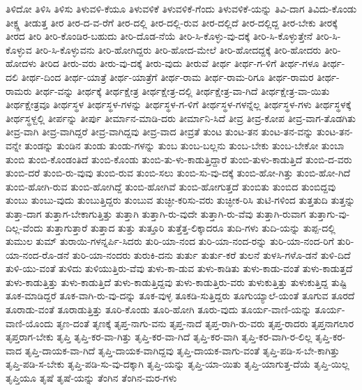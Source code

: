{ತಿಳಿದೋ
ತಿಳಿಸಿ
ತಿಳಿಸು
ತಿಳುವಳಿ-ಕೆಯೂ
ತಿಳುವಳಿಕೆ
ತಿಳುವಳಿಕೆ-ಗೆಂದು
ತಿಳುವಳಿಕೆ-ಯನ್ನು
ತಿವಿ-ದಾಗ
ತಿವಿದು-ಕೊಂಡು
ತೀಕ್ಷ್ಣ
ತೀಡುತ್ತ
ತೀರ
ತೀರ-ದ-ವ-ರೆಗೆ
ತೀರ-ದಲ್ಲಿ
ತೀರ-ದಲ್ಲಿ-ರುವ
ತೀರ-ದಲ್ಲಿದೆ
ತೀರ-ದಲ್ಲಿದ್ದ
ತೀರ-ಬೇಕು
ತೀರಕ್ಕೆ
ತೀರದ
ತೀರಿ
ತೀರಿ-ಕೊಂಡಿರ-ಬಹುದು
ತೀರಿ-ದೊಡ-ನೆಯೆ
ತೀರಿ-ಸಿ-ಕೊಳ್ಳು-ವು-ದಕ್ಕೆ
ತೀರಿ-ಸಿ-ಕೊಳ್ಳುತ್ತೇನೆ
ತೀರಿ-ಸಿ-ಕೊಳ್ಳುವ
ತೀರಿ-ಸಿ-ಕೊಳ್ಳುವನು
ತೀರಿ-ಹೋಗಿದ್ದರು
ತೀರಿ-ಹೋದ-ಮೇಲೆ
ತೀರಿ-ಹೋದದ್ದಕ್ಕೆ
ತೀರಿ-ಹೋದರು
ತೀರಿ-ಹೋದಳು
ತೀರಿದ
ತೀರು-ವರು
ತೀರು-ವು-ದಕ್ಕೆ
ತೀರು-ವುದು
ತೀರುವೆ
ತೀರ್ಥ
ತೀರ್ಥ-ಗ-ಳಿಗೆ
ತೀರ್ಥ-ಗಳೂ
ತೀರ್ಥ-ದಲಿ
ತೀರ್ಥ-ದಿಂದ
ತೀರ್ಥ-ಯಾತ್ರೆ
ತೀರ್ಥ-ಯಾತ್ರೆಗೆ
ತೀರ್ಥ-ರಾಮ
ತೀರ್ಥ-ರಾಮ-ರಿಗೂ
ತೀರ್ಥ-ರಾಮರ
ತೀರ್ಥ-ರಾಮರು
ತೀರ್ಥ-ವನ್ನು
ತೀರ್ಥಕ್ಕೆ
ತೀರ್ಥಕ್ಷೇತ್ರ
ತೀರ್ಥಕ್ಷೇತ್ರ-ದಲ್ಲಿ
ತೀರ್ಥಕ್ಷೇತ್ರ-ವಾ-ಗಿದೆ
ತೀರ್ಥಕ್ಷೇತ್ರ-ವಾ-ಯಿತು
ತೀರ್ಥಕ್ಷೇತ್ರವೂ
ತೀರ್ಥಸ್ಥಳ
ತೀರ್ಥಸ್ಥಳ-ಗಳನ್ನು
ತೀರ್ಥಸ್ಥಳ-ಗ-ಳಿಗೆ
ತೀರ್ಥಸ್ಥಳ-ಗಳನ್ನೆಲ್ಲ
ತೀರ್ಥಸ್ಥಳ-ಗಳು
ತೀರ್ಥಸ್ಥಳಕ್ಕೆ
ತೀರ್ಥಸ್ಥಳ್ದಲ್ಲಿ
ತೀರ್ಪನ್ನು
ತೀರ್ಪು
ತೀರ್ಮಾನ-ಮಾಡಿ-ದರು
ತೀರ್ಮಾನಿ-ಸಿದೆ
ತೀವ್ರ
ತೀವ್ರ-ಕೋಪ
ತೀವ್ರ-ವಾಗ-ತೊಡಗಿತು
ತೀವ್ರ-ವಾಗಿ
ತೀವ್ರ-ವಾಗಿದ್ದರೆ
ತೀವ್ರ-ವಾಗಿದ್ದವು
ತೀವ್ರ-ವಾದ
ತೀವ್ರತೆ
ತುಂಟ
ತುಂಟ-ತನ
ತುಂಟ-ತನ-ವನ್ನು
ತುಂಟ-ತನ-ವನ್ನೇ
ತುಂಡನ್ನು
ತುಂಡಿನ
ತುಂಡು
ತುಂಡು-ಗಳನ್ನು
ತುಂಬ
ತುಂಬ-ಬಲ್ಲನು
ತುಂಬ-ಬೇಕು
ತುಂಬ-ಬೇಕೋ
ತುಂಬಾ
ತುಂಬಿ
ತುಂಬಿ-ಕೊಂಡಂತಿದೆ
ತುಂಬಿ-ಕೊಂಡು
ತುಂಬಿ-ತು-ಳು-ಕಾಡುತ್ತಿದ್ದಾರೆ
ತುಂಬಿ-ತುಳು-ಕಾಡುತ್ತಿದೆ
ತುಂಬಿ-ದ-ವರು
ತುಂಬಿ-ದರೆ
ತುಂಬಿ-ರು-ವುವು
ತುಂಬಿ-ರುವ
ತುಂಬಿ-ಸಲು
ತುಂಬಿ-ಸು-ವು-ದಕ್ಕೆ
ತುಂಬಿ-ಹೋ-ಗಿತ್ತು
ತುಂಬಿ-ಹೋ-ಗಿದೆ
ತುಂಬಿ-ಹೋಗಿ-ರುವ
ತುಂಬಿ-ಹೋಗಿದ್ದೆ
ತುಂಬಿ-ಹೋಗಿವೆ
ತುಂಬಿ-ಹೋಗುತ್ತದೆ
ತುಂಬಿತು
ತುಂಬಿದ
ತುಂಬಿದ್ದವು
ತುಂಬು
ತುಂಬು-ವುದು
ತುಂಬುತ್ತಿದ್ದರು
ತುಂಬುವ
ತುಚ್ಛೀ-ಕರಿಸು-ವರು
ತುಚ್ಛೀಕ-ರಿಸಿ
ತುಟಿ-ಗಳಿಂದ
ತುತ್ತತುದಿ
ತುತ್ತನ್ನು
ತುತ್ತಾ-ದಾಗ
ತುತ್ತಾಗ-ಬೇಕಾಗುತ್ತಿತ್ತು
ತುತ್ತಾಗಿ
ತುತ್ತಾಗಿ-ರು-ವುದೇ
ತುತ್ತಾಗಿ-ರು-ವೆವು
ತುತ್ತಾಗಿ-ರುವಾಗ
ತುತ್ತಾಗು-ವು-ದಿಲ್ಲ-ವೆಂದು
ತುತ್ತಾಗುತ್ತಾರೆ
ತುತ್ತಾದ
ತುತ್ತು
ತುತ್ತೂರಿ
ತುತ್ತೆತ್ತ-ಲಿಕ್ಕಾದರೂ
ತುದಿ-ಗಳು
ತುದಿ-ಯನ್ನು
ತುಪ್ಪ-ದಲ್ಲಿ
ತುಮುಲ
ತುಮ್
ತುರಾಯಿ-ಗಳನ್ನರ್ಪಿ-ಸಿದರು
ತುರಿ-ಯಾ-ನಂದ
ತುರಿ-ಯಾ-ನಂದ-ರನ್ನು
ತುರಿ-ಯಾ-ನಂದ-ರಿಗೆ
ತುರಿ-ಯಾ-ನಂದ-ರೊ-ಡನೆ
ತುರಿ-ಯಾ-ನಂದರು
ತುರುಕಿ-ದನು
ತುರ್ತು
ತುರ್ತು-ಕರೆ
ತುಲನೆ
ತುಳಸಿ-ಗಳೊ-ಡನೆ
ತುಳಿ-ದಿದೆ
ತುಳಿ-ಯು-ವಂತೆ
ತುಳಿದು
ತುಳಿಯುತ್ತಿರು-ವೆವು
ತುಳು-ಕಾ-ಡುವ
ತುಳು-ಕಾಡಿತು
ತುಳು-ಕಾಡು-ವಂತೆ
ತುಳು-ಕಾಡುತ್ತದೆ
ತುಳು-ಕಾಡುತ್ತಿತ್ತು
ತುಳು-ಕಾಡುತ್ತಿದೆ
ತುಳು-ಕಾಡುತ್ತಿದ್ದವು
ತುಳು-ಕಾಡುತ್ತಿರು-ವರು
ತುಳುಕುತ್ತಿತ್ತು
ತುಳುಕುತ್ತಿದ್ದ
ತುಷ್ಟಿ
ತೂಕ-ಮಾಡಿದ್ದರೆ
ತೂಕ-ವಾಗಿ-ರು-ವು-ದನ್ನು
ತೂಕ-ವುಳ್ಳ
ತೂಕಡಿ-ಸುತ್ತಿದ್ದರು
ತೂಗುಯ್ಯಾಲೆ-ಯಂತೆ
ತೂಗುವ
ತೂರದೆ
ತೂರಾಡು-ವಂತೆ
ತೂರಾಡುತ್ತಿತ್ತು
ತೂರಿ-ಕೊಂಡು
ತೂರಿ-ಹೋಗಿ
ತೂರು-ವುದು
ತೂರ್ಯ-ವಾಣಿ-ಯನ್ನು
ತೂರ್ಯ-ವಾಣಿ-ಯೊಂದು
ತೃಣ-ದಂತೆ
ತೃಣಕ್ಕೆ
ತೃಪ್ತ-ನಾಗು-ವನು
ತೃಪ್ತ-ನಾದೆ
ತೃಪ್ತ-ರಾಗಿ-ರು-ವರು
ತೃಪ್ತ-ರಾದರು
ತೃಪ್ತನಾಗಲಾರ
ತೃಪ್ತರಾಗ-ಬೇಕು
ತೃಪ್ತಿ
ತೃಪ್ತಿ-ಕರ-ವಾ-ಗಿತ್ತು
ತೃಪ್ತಿ-ಕರ-ವಾ-ಗಿದೆ
ತೃಪ್ತಿ-ಕರ-ವಾಗಿ
ತೃಪ್ತಿ-ಕರ-ವಾಗಿ-ರ-ಲಿಲ್ಲ
ತೃಪ್ತಿ-ಕರ-ವಾದ
ತೃಪ್ತಿ-ದಾಯಕ-ವಾ-ಗಿದೆ
ತೃಪ್ತಿ-ದಾಯಕ-ವಾಗಿದ್ದವು
ತೃಪ್ತಿ-ದಾಯಕ-ವಾಗು-ವಂತೆ
ತೃಪ್ತಿ-ಪಡಿ-ಸ-ಬೇ-ಕಾಗಿತ್ತು
ತೃಪ್ತಿ-ಪಡಿ-ಸ-ಬೇಕು
ತೃಪ್ತಿ-ಪಡಿ-ಸು-ವು-ದಕ್ಕಾಗಿ
ತೃಪ್ತಿ-ಯನ್ನು
ತೃಪ್ತಿ-ಯಾ-ಯಿತು
ತೃಪ್ತಿ-ಯಾಗುತ್ತ-ದೆಯೆ
ತೃಪ್ತಿ-ಯಿಲ್ಲ
ತೃಪ್ತಿಯೂ
ತೃಷೆ
ತೃಷೆ-ಯನ್ನು
ತೆಂಗಿನ
ತೆಂಗಿನ-ಮರ-ಗಳು
}
